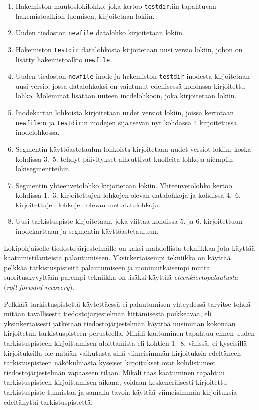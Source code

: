 \begin{enumerate}
    \item{Hakemiston muutoslokilohko,
          joka kertoo \texttt{testdir}:iin tapahtuvan hakemistoalkion luomisen,
          kirjoitetaan lokiin.}
    \item{Uuden tiedoston \texttt{newfile} datalohko kirjoitetaan lokiin.}
    \item{Hakemiston \texttt{testdir} datalohkosta kirjoitetaan uusi versio lokiin,
          johon on lisätty hakemistoalkio \texttt{newfile}.}
    \item{Uuden tiedoston \texttt{newfile} inode ja hakemiston \texttt{testdir} inodesta kirjoitetaan uusi versio,
          jossa datalohkoksi on vaihtunut edellisessä kohdassa kirjoitettu lohko.
          Molemmat lisätään uuteen inodelohkoon,
          joka kirjoitetaan lokiin.}
    \item{Inodekartan lohkoista kirjoitetaan uudet versiot lokiin,
          joissa kerrotaan \texttt{newfile}:n ja \texttt{testdir}:n inodejen sijaitsevan nyt kohdassa 4 kirjoitetussa inodelohkossa.}
    \item{Segmentin käyttöastetaulun lohkoista kirjoitetaan uudet versiot lokiin,
          koska kohdissa 3.--5. tehdyt päivitykset aiheuttivat kuolleita lohkoja aiempiin lokisegmentteihin.}
    \item{Segmentin yhteenvetolohko kirjoitetaan lokiin. Yhteenvetolohko kertoo kohdissa 1.--3. kirjoitettujen lohkojen olevan datalohkoja ja kohdissa 4.--6. kirjoitettujen lohkojen olevan metadatalohkoja.}
    \item{Uusi tarkistuspiste kirjoitetaan, joka viittaa kohdissa 5. ja 6. kirjoitettuun inodekarttaan ja segmentin käyttöastetauluun.}
\end{enumerate}
Lokipohjaiselle tiedostojärjestelmälle on kaksi mahdollista tekniikkaa jota käyttää kaatumistilanteista palautumiseen.
Yksinkertaisempi tekniikka on käyttää pelkkää tarkistuspisteitä palautumiseen ja monimutkaisempi mutta suorituskyvyltään parempi tekniikka on lisäksi käyttää \emph{eteenkiertopalautusta} (\emph{roll-forward recovery}).

Pelkkää tarkistuspistettä käytettäessä ei palautumisen yhteydessä tarvitse tehdä mitään tavallisesta tiedostojärjestelmän liittämisestä poikkeavaa,
eli yksinkertaisesti jatketaan tiedostojärjestelmän käyttöä uusimman kokonaan kirjoitetun tarkistuspisteen perusteella.
Mikäli kaatuminen tapahtuu ennen uuden tarkistuspisteen kirjoittamisen aloittamista eli kohtien 1.--8. välissä,
ei kyseisillä kirjoituksilla ole mitään vaikutusta sillä viimeisimmän kirjoituksia edeltäneen tarkistuspisteen näkökulmasta kyseiset kirjoitukset ovat kohdistuneet tiedostojärjestelmän vapaaseen tilaan.
Mikäli taas kaatuminen tapahtuu tarkistuspisteen kirjoittamisen aikana,
voidaan keskeneräisesti kirjoitettu tarkistuspiste tunnistaa ja samalla tavoin käyttää viimeisimmän kirjoituksia edeltänyttä tarkistuspistettä.

